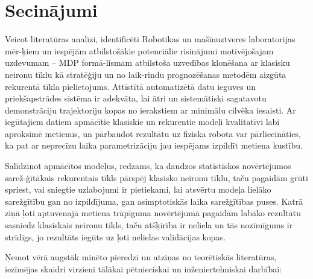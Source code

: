 \documentclass[12pt, a4paper]{article}
\numberwithin{equation}{section} %
\begin{document}
\newpage
{}
\section*{Secinājumi} %

Veicot literatūras analīzi, identificēti Robotikas un mašīnuztveres laboratorijas mēr-ķiem un iespējām atbilstošākie potenciālie risinājumi motivējošajam uzdevumam -- MDP formā-lismam atbilstoša uzvedības klonēšana ar klasisku neironu tīklu kā stratēģiju un no laik-rindu prognozēšanas metodēm aizgūta rekurentā tīkla pielietojums. Attīstītā automatizētā datu ieguves un priekšapstrādes sistēma ir adekvāta, lai ātri un sistemātiski sagatavotu demonstrāciju trajektoriju kopas no ierakstiem ar minimālu cilvēka iesaisti. Ar iegūtajiem datiem apmācītie klasiskie un rekurentie modeļi kvalitatīvi labi aproksimē metienus, un pārbaudot rezultātu uz fiziska robota var pārliecināties, ka pat ar neprecīzu laika parametrizāciju jau iespējams izpildīt metiena kustību.

Salīdzinot apmācītos modeļus, redzams, ka daudzos statistiskos novērtējumos sarež-ģītākais rekurentais tīkls pārspēj klasisko neironu tīklu, taču pagaidām grūti spriest, vai sniegtie uzlabojumi ir pietiekami, lai atsvērtu modeļa lielāko sarežģītību gan no izpildījuma, gan asimptotiskās laika sarežģītības puses. Katrā ziņā ļoti aptuvenajā metiena trāpīguma novērtējumā pagaidām labāko rezultātu sasniedz klasiskais neironu tīkls, taču atšķirība ir neliela un tās nozīmīgums ir strīdīgs, jo rezultāts iegūts uz ļoti nelielas validācijas kopas.

Ņemot vērā augstāk minēto pieredzi un atziņas no teorētiskās literatūras, iezīmējas skaidri virzieni tālākai pētnieciskai un inženiertehniskai darbībai:
\end{document}
